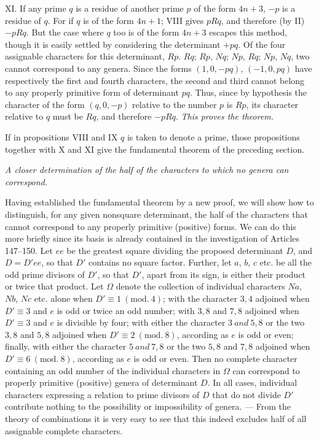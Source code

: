 XI. If any prime $q$ is a residue of another prime $p$ of the form $4n+3$, $-p$ is a residue of $q$. For if $q$ is of the form $4n+1$; VIII gives $pRq$, and therefore (by II) $-pRq$. But the case where $q$ too is of the form $4n+3$ escapes this method, though it is easily settled by considering the determinant $+pq$. Of the four assignable characters for this determinant, $Rp$. $Rq$; $Rp$, $Nq$; $Np$, $Rq$; $Np$, $Nq$, two cannot correspond to any genera. Since the forms $(1,0,-pq)$, $(-1,0,pq)$ have respectively the first and fourth characters, the second and third cannot belong to any properly primitive form of determinant $pq$. Thus, since by hypothesis the character of the form $(q,0,-p)$ relative to the number $p$ is $Rp$, its character relative to $q$ must be $Rq$, and therefore $-pRq$. \textit{This proves the theorem.}

If in propositions VIII and IX $q$ is taken to denote a prime, those propositions together with X and XI give the fundamental theorem of the preceding section.
\begin{center}
\textit{A closer determination of the half of the characters to which no genera can correspond.}
\end{center}

Having established the fundamental theorem by a new proof, we will show how to distinguish, for any given nonsquare determinant, the half of the characters that cannot correspond to any properly primitive (positive) forms. We can do this more briefly since its basis is already contained in the investigation of Articles 147--150. Let $ee$ be the greatest square dividing the proposed determinant $D$, and $D=D'ee$, so that $D'$ contains no square factor. Further, let $a$, $b$, $c$ etc. be all the odd prime divisors of $D'$, so that $D'$, apart from its sign, is either their product or twice that product. Let $\Omega$ denote the collection of individual characters $Na$, $Nb$, $Nc$ etc. alone when $D'\equiv1\ (\mathrm{mod.}\ 4)$; with the character $3,4$ adjoined when $D'\equiv3$ and $e$ is odd or twice an odd number; with $3,8$ and $7,8$ adjoined when $D'\equiv3$ and $e$ is divisible by four; with either the character $3\ \mathit{and}\ 5,8$ or the two $3,8$ and $5,8$ adjoined when $D'\equiv2\ (\mathrm{mod.}\ 8)$, according as $e$ is odd or even; finally, with either the character $5\ \mathit{and}\ 7,8$ or the two $5,8$ and $7,8$ adjoined when $D'\equiv6\ (\mathrm{mod.}\ 8)$, according as $e$ is odd or even. Then no complete character containing an odd number of the individual characters in $\Omega$ can correspond to properly primitive (positive) genera of determinant $D$. In all cases, individual characters expressing a relation to prime divisors of $D$ that do not divide $D'$ contribute nothing to the possibility or impossibility of genera. --- From the theory of combinations it is very easy to see that this indeed excludes half of all assignable complete characters.

